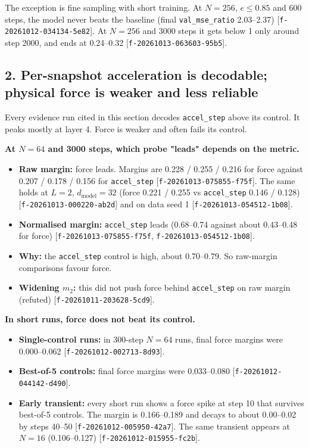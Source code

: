 \documentclass{article}
\begin{document}
The exception is fine sampling with short training. At $N = 256$, $e \le 0.85$ and 600 steps, the model never beats the baseline (final \texttt{val\_mse\_ratio} 2.03–2.37) [\texttt{f-20261012-034134-5e82}]. At $N = 256$ and 3000 steps it gets below 1 only around step 2000, and ends at 0.24–0.32 [\texttt{f-20261013-063603-95b5}].

\subsection{2. Per-snapshot acceleration is decodable; physical force is weaker and less reliable}

Every evidence run cited in this section decodes \texttt{accel\_step} above its control. It peaks mostly at layer 4. Force is weaker and often fails its control.

\textbf{At $N = 64$ and 3000 steps, which probe "leads" depends on the metric.}

\begin{itemize}
\item \textbf{Raw margin:} force leads. Margins are 0.228 / 0.255 / 0.216 for force against 0.207 / 0.178 / 0.156 for \texttt{accel\_step} [\texttt{f-20261013-075855-f75f}]. The same holds at $L = 2$, $d_{\text{model}} = 32$ (force 0.221 / 0.255 vs \texttt{accel\_step} 0.146 / 0.128) [\texttt{f-20261013-000220-ab2d}] and on data seed 1 [\texttt{f-20261013-054512-1b08}].
\item \textbf{Normalised margin:} \texttt{accel\_step} leads (0.68–0.74 against about 0.43–0.48 for force) [\texttt{f-20261013-075855-f75f}, \texttt{f-20261013-054512-1b08}].
\item \textbf{Why:} the \texttt{accel\_step} control is high, about 0.70–0.79. So raw-margin comparisons favour force.
\item \textbf{Widening $m_2$:} this did not push force behind \texttt{accel\_step} on raw margin (refuted) [\texttt{f-20261011-203628-5cd9}].
\end{itemize}

\textbf{In short runs, force does not beat its control.}

\begin{itemize}
\item \textbf{Single-control runs:} in 300-step $N = 64$ runs, final force margins were 0.000–0.062 [\texttt{f-20261012-002713-8d93}].
\item \textbf{Best-of-5 controls:} final force margins were 0.033–0.080 [\texttt{f-20261012-044142-d490}].
\item \textbf{Early transient:} every short run shows a force spike at step 10 that survives best-of-5 controls. The margin is 0.166–0.189 and decays to about 0.00–0.02 by steps 40–50 [\texttt{f-20261012-005950-42a7}]. The same transient appears at $N = 16$ (0.106–0.127) [\texttt{f-20261012-015955-fc2b}].
\end{itemize}
\end{document}
